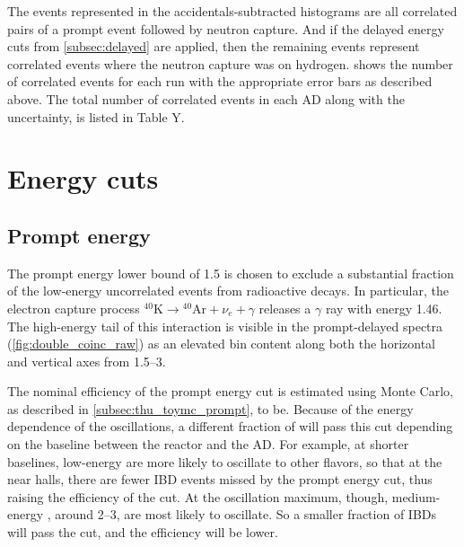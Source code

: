 The events represented in the accidentals-subtracted histograms
are all correlated pairs
of a prompt event followed by neutron capture.
And if the delayed energy cuts from \cref{subsec:delayed} are applied,
then the remaining events represent correlated events
where the neutron capture was on hydrogen.
 shows the number of correlated events for each run
with the appropriate error bars as described above.
The total number of correlated events in each AD
along with the uncertainty, is listed in Table Y.

\begin{figure}
    \caption{}
    \label{fig:ncorr}
\end{figure}


\section{Energy cuts}
\label{sec:energy_cuts}

\subsection{Prompt energy}
\label{subsec:prompt_energy}
The prompt energy lower bound of \SI{1.5}{\mev}
is chosen to exclude a substantial fraction
of the low-energy uncorrelated events from radioactive decays.
In particular, the electron capture process
${}^{40}\text{K} \to {}^{40}\text{Ar} + \nu_e + \gamma$
releases a $\gamma$ ray with energy \SI{1.46}{\mev}.
The high-energy tail of this interaction is visible in the prompt-delayed spectra
(\cref{fig:double_coinc_raw}) as an elevated bin content
along both the horizontal and vertical axes from \SIrange{1.5}{3}{\mev}.

The nominal efficiency of the prompt energy cut is estimated using Monte Carlo,
as described in \cref{subsec:thu_toymc_prompt}, to be.
Because of the energy dependence of the \nuebar{} oscillations,
a different fraction of \nuebar{} will pass this cut
depending on the baseline between the reactor and the AD.
For example, at shorter baselines, low-energy \nuebar{}
are more likely to oscillate to other flavors, so that at the near halls,
there are fewer IBD events missed by the prompt energy cut,
thus raising the efficiency of the cut.
At the oscillation maximum, though, medium-energy \nuebar{},
around \SIrange{2}{3}{\mev}, are most likely to oscillate.
So a smaller fraction of IBDs will pass the cut,
and the efficiency will be lower.

